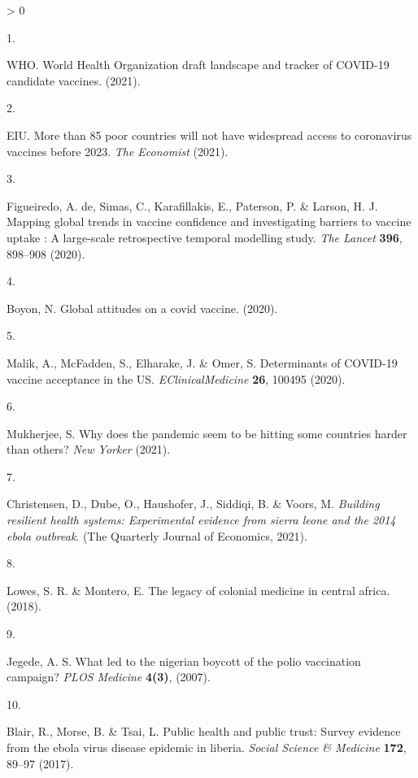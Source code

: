 \documentclass[
  12pt,
]{article}
\newlength{\cslhangindent}
\newlength{\csllabelwidth}
\newenvironment{CSLReferences}[2] %
 {%
  \setlength{\parindent}{0pt}
  \ifodd #1 \everypar{\setlength{\hangindent}{\cslhangindent}}\ignorespaces\fi
  \ifnum #2 > 0
  \setlength{\parskip}{#2\baselineskip}
  \fi
 }%
 {}
\newcommand{\CSLLeftMargin}[1]{\parbox[t]{\csllabelwidth}{#1}}
\newcommand{\CSLRightInline}[1]{\parbox[t]{\linewidth - \csllabelwidth}{#1}\break}
\begin{document}
\hypertarget{refs}{}
\begin{CSLReferences}{0}{0}
\leavevmode\hypertarget{ref-who1}{}%
\CSLLeftMargin{1. }
\CSLRightInline{WHO. {World Health Organization} draft landscape and tracker of COVID-19 candidate vaccines. (2021).}

\leavevmode\hypertarget{ref-eiu}{}%
\CSLLeftMargin{2. }
\CSLRightInline{EIU. More than 85 poor countries will not have widespread access to coronavirus vaccines before 2023. \emph{The Economist} (2021).}

\leavevmode\hypertarget{ref-defigueiredo2020lancet}{}%
\CSLLeftMargin{3. }
\CSLRightInline{Figueiredo, A. de, Simas, C., Karafillakis, E., Paterson, P. \& Larson, H. J. Mapping global trends in vaccine confidence and investigating barriers to vaccine uptake : A large-scale retrospective temporal modelling study. \emph{The Lancet} \textbf{396}, 898--908 (2020).}

\leavevmode\hypertarget{ref-boyon2020ipsos}{}%
\CSLLeftMargin{4. }
\CSLRightInline{Boyon, N. Global attitudes on a covid vaccine. (2020).}

\leavevmode\hypertarget{ref-Malik2020}{}%
\CSLLeftMargin{5. }
\CSLRightInline{Malik, A., McFadden, S., Elharake, J. \& Omer, S. Determinants of COVID-19 vaccine acceptance in the US. \emph{EClinicalMedicine} \textbf{26}, 100495 (2020).}

\leavevmode\hypertarget{ref-mukherjee}{}%
\CSLLeftMargin{6. }
\CSLRightInline{Mukherjee, S. Why does the pandemic seem to be hitting some countries harder than others? \emph{New Yorker} (2021).}

\leavevmode\hypertarget{ref-christensen2020building}{}%
\CSLLeftMargin{7. }
\CSLRightInline{Christensen, D., Dube, O., Haushofer, J., Siddiqi, B. \& Voors, M. \emph{Building resilient health systems: Experimental evidence from sierra leone and the 2014 ebola outbreak}. (The Quarterly Journal of Economics, 2021).}

\leavevmode\hypertarget{ref-Lowes2018}{}%
\CSLLeftMargin{8. }
\CSLRightInline{Lowes, S. R. \& Montero, E. The legacy of colonial medicine in central africa. (2018).}

\leavevmode\hypertarget{ref-Jegede2007}{}%
\CSLLeftMargin{9. }
\CSLRightInline{Jegede, A. S. What led to the nigerian boycott of the polio vaccination campaign? \emph{PLOS Medicine} \textbf{4(3)}, (2007).}

\leavevmode\hypertarget{ref-BLAIR201789}{}%
\CSLLeftMargin{10. }
\CSLRightInline{Blair, R., Morse, B. \& Tsai, L. Public health and public trust: Survey evidence from the ebola virus disease epidemic in liberia. \emph{Social Science \& Medicine} \textbf{172}, 89--97 (2017).}


\end{CSLReferences}
\end{document}
